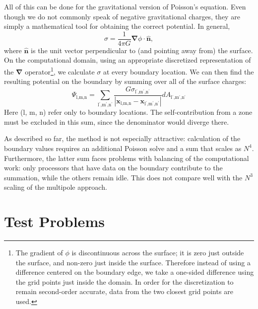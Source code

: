 \documentclass[12pt,preprint]{aastex}
\begin{document}
All of this can be done for the gravitational version of Poisson's equation. Even though we do not commonly speak of negative gravitational charges, they are simply a mathematical tool for obtaining the correct potential. In general,
\begin{equation}
  \sigma = \frac{1}{4\pi G} {\bm{\nabla}} \phi \cdot \hat{\mathbf{n}},
\end{equation}
where $\hat{\mathbf{n}}$ is the unit vector perpendicular to (and pointing away from) the surface. On the computational domain, using an appropriate discretized representation of the ${\bm{\nabla}}$ operator\footnote{The gradient of $\phi$ is discontinuous across the surface; it is zero just outside the surface, and non-zero just inside the surface. Therefore instead of using a difference centered on the boundary edge, we take a one-sided difference using the grid points just inside the domain. In order for the discretization to remain second-order accurate, data from the two closest grid points are used.}, we calculate $\sigma$ at every boundary location. We can then find the resulting potential on the boundary by summing over all of the surface charges:
\begin{equation}
  \Psi_{\text{l,m,n}} = \sum_{\text{l$^\prime$,m$^\prime$,n$^\prime$}} \frac{G\sigma_{\text{l$^\prime$,m$^\prime$,n$^\prime$}}}{\left|\mathbf{x}_{\text{l,m,n}} - \mathbf{x}_{\text{l$^\prime$,m$^\prime$,n$^\prime$}}\right|} dA_{\text{l$^\prime$,m$^\prime$,n$^\prime$}}
\end{equation}
Here (l, m, n) refer only to boundary locations. The self-contribution from a zone must be excluded in this sum, since the denominator would diverge there.

As described so far, the method is not especially attractive: calculation of the boundary values requires an additional Poisson solve and a sum that scales as $N^4$. Furthermore, the latter sum faces problems with balancing of the computational work: only processors that have data on the boundary contribute to the summation, while the others remain idle. This does not compare well with the $N^3$ scaling of the multipole approach.

\section{Test Problems}\label{Sec:Tests}
\end{document}
